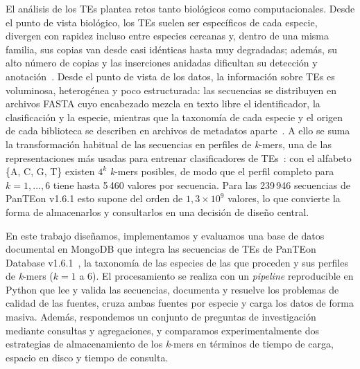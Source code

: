 El análisis de los TEs plantea retos tanto biológicos como
computacionales. Desde el punto de vista biológico, los TEs suelen ser
específicos de cada especie, divergen con rapidez incluso entre especies
cercanas y, dentro de una misma familia, sus copias van desde casi
idénticas hasta muy degradadas; además, su alto número de copias y las
inserciones anidadas dificultan su detección y anotación~\cite{orozcoarias2026panteon}.
Desde el punto de vista de los datos, la información sobre TEs es
voluminosa, heterogénea y poco estructurada: las secuencias se
distribuyen en archivos FASTA cuyo encabezado mezcla en texto libre el
identificador, la clasificación y la especie, mientras que la taxonomía
de cada especie y el origen de cada biblioteca se describen en archivos
de metadatos aparte~\cite{orozcoarias2026panteon,panteon2026zenodo}.
A ello se suma la transformación habitual de las secuencias en perfiles
de \textit{k}-mers, una de las representaciones más usadas para
entrenar clasificadores de TEs~\cite{orozcoarias2026panteon}: con el
alfabeto \{A, C, G, T\} existen $4^k$ \textit{k}-mers posibles, de modo
que el perfil completo para $k=1,\dots,6$ tiene hasta 5\,460 valores por
secuencia. Para las 239\,946 secuencias de PanTEon v1.6.1 esto supone
del orden de $1{,}3\times10^{9}$ valores, lo que convierte la forma de
almacenarlos y consultarlos en una decisión de diseño central.

En este trabajo diseñamos, implementamos y evaluamos una base de datos
documental en MongoDB que integra las secuencias de TEs de PanTEon
Database v1.6.1~\cite{panteon2026zenodo}, la taxonomía de las especies
de las que proceden y sus perfiles de \textit{k}-mers ($k=1$ a $6$).
El procesamiento se realiza con un \textit{pipeline} reproducible en
Python que lee y valida las secuencias, documenta y resuelve los
problemas de calidad de las fuentes, cruza ambas fuentes por especie y
carga los datos de forma masiva. Además, respondemos un conjunto de
preguntas de investigación mediante consultas y agregaciones, y
comparamos experimentalmente dos estrategias de almacenamiento de los
\textit{k}-mers en términos de tiempo de carga, espacio en disco y
tiempo de consulta.

